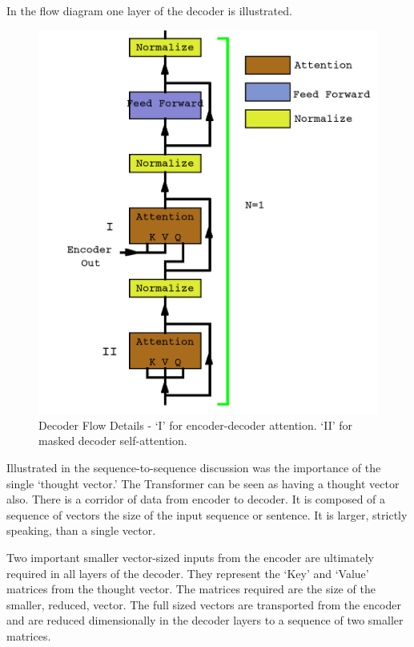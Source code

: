 In the flow diagram one layer of the decoder is illustrated.

\begin{figure}[H]
	\begin{center}
		
		
		\includegraphics[scale=1.25]{diagram-flow-decoder02}
	\end{center}
	\caption[Decoder Flow]{Decoder Flow Details - `I' for encoder-decoder attention. `II' for masked decoder self-attention.}
	
	
\end{figure}


Illustrated in the sequence-to-sequence discussion was the importance of the single `thought vector.' The Transformer can be seen as having a thought vector also. There is a corridor of data from encoder to decoder. It is composed of a sequence of vectors the size of the input sequence or sentence. It is larger, strictly speaking, than a single vector.

Two important smaller vector-sized inputs from the encoder are ultimately required in all layers of the decoder. They represent the `Key' and `Value' matrices from the thought vector. The matrices required are the size of the smaller, reduced, vector. The full sized vectors are transported from the encoder and are reduced dimensionally in the decoder layers to a sequence of two smaller matrices. 

